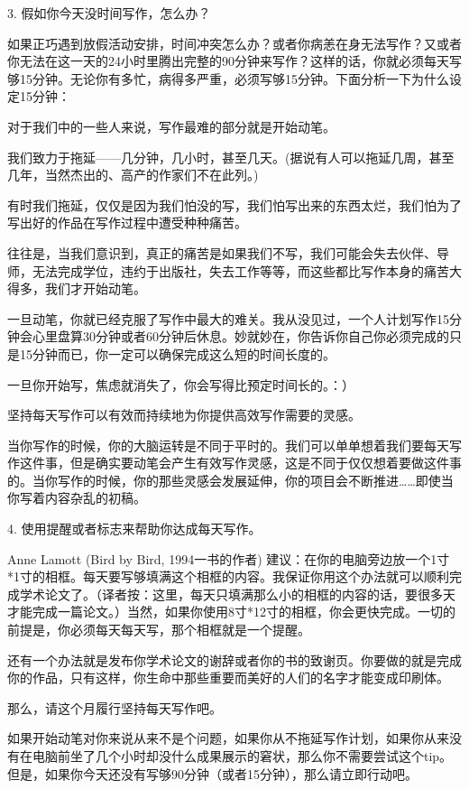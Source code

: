 \documentclass{ctexart}
\begin{document}
3. 假如你今天没时间写作，怎么办？

如果正巧遇到放假活动安排，时间冲突怎么办？或者你病恙在身无法写作？又或者你无法在这一天的24小时里腾出完整的90分钟来写作？这样的话，你就必须每天写够15分钟。无论你有多忙，病得多严重，必须写够15分钟。下面分析一下为什么设定15分钟：

{\heiti 对于我们中的一些人来说，写作最难的部分就是开始动笔。}

我们致力于拖延——几分钟，几小时，甚至几天。(据说有人可以拖延几周，甚至几年，当然杰出的、高产的作家们不在此列。)

有时我们拖延，仅仅是因为我们怕没的写，我们怕写出来的东西太烂，我们怕为了写出好的作品在写作过程中遭受种种痛苦。

往往是，当我们意识到，真正的痛苦是如果我们不写，我们可能会失去伙伴、导师，无法完成学位，违约于出版社，失去工作等等，而这些都比写作本身的痛苦大得多，我们才开始动笔。

一旦动笔，你就已经克服了写作中最大的难关。我从没见过，一个人计划写作15分钟会心里盘算30分钟或者60分钟后休息。妙就妙在，你告诉你自己你必须完成的只是15分钟而已，你一定可以确保完成这么短的时间长度的。

一旦你开始写，焦虑就消失了，你会写得比预定时间长的。：）

{\heiti 坚持每天写作可以有效而持续地为你提供高效写作需要的灵感。}

当你写作的时候，你的大脑运转是不同于平时的。我们可以单单想着我们要每天写作这件事，但是确实要动笔会产生有效写作灵感，这是不同于仅仅想着要做这件事的。当你写作的时候，你的那些灵感会发展延伸，你的项目会不断推进……即使当你写着内容杂乱的初稿。

4. 使用提醒或者标志来帮助你达成每天写作。

Anne Lamott (Bird by Bird, 1994一书的作者) 建议：在你的电脑旁边放一个1寸*1寸的相框。每天要写够填满这个相框的内容。我保证你用这个办法就可以顺利完成学术论文了。（译者按：这里，每天只填满那么小的相框的内容的话，要很多天才能完成一篇论文。）当然，如果你使用8寸*12寸的相框，你会更快完成。一切的前提是，你必须每天每天写，那个相框就是一个提醒。

还有一个办法就是发布你学术论文的谢辞或者你的书的致谢页。你要做的就是完成你的作品，只有这样，你生命中那些重要而美好的人们的名字才能变成印刷体。

那么，请这个月履行坚持每天写作吧。

如果开始动笔对你来说从来不是个问题，如果你从不拖延写作计划，如果你从来没有在电脑前坐了几个小时却没什么成果展示的窘状，那么你不需要尝试这个tip。但是，如果你今天还没有写够90分钟（或者15分钟），那么请立即行动吧。
\end{document}
